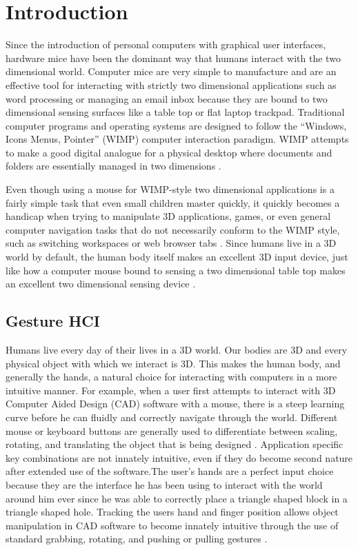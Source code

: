 \chapter{Introduction}

Since the introduction of personal computers with graphical user interfaces, hardware mice have been the dominant way that humans interact with the two dimensional world. Computer mice are very simple to manufacture and are an effective tool for interacting with strictly two dimensional applications such as word processing or managing an email inbox because they are bound to two dimensional sensing surfaces like a table top or flat laptop trackpad. Traditional computer programs and operating systems are designed to follow the “Windows, Icons Menus, Pointer” (WIMP) computer interaction paradigm. WIMP attempts to make a good digital analogue for a physical desktop where documents and folders are essentially managed in two dimensions \cite{hinckley2002input}.

Even though using a mouse for WIMP-style two dimensional applications is a fairly simple task that even small children master quickly, it quickly becomes a handicap when trying to manipulate 3D applications, games, or even general computer navigation tasks that do not necessarily conform to the WIMP style, such as switching workspaces or web browser tabs \cite{krueger1991artificial}. Since humans live in a 3D world by default, the human body itself makes an excellent 3D input device, just like how a computer mouse bound to sensing a two dimensional table top makes an excellent two dimensional sensing device \cite{wren1996pfinder}.

\section{Gesture HCI}

Humans live every day of their lives in a 3D world. Our bodies are 3D and every physical object with which we interact is 3D. This makes the human body, and generally the hands, a natural choice for interacting with computers in a more intuitive manner. For example, when a user first attempts to interact with 3D Computer Aided Design (CAD) software with a mouse, there is a steep learning curve before he can fluidly and correctly navigate through the world. Different mouse or keyboard buttons are generally used to differentiate between scaling, rotating, and translating the object that is being designed \cite{hamade2007evaluating}. Application specific key combinations are not innately intuitive, even if they do become second nature after extended use of the software.The user’s hands are a perfect input choice because they are the interface he has been using to interact with the world around him ever since he was able to correctly place a triangle shaped block in a triangle shaped hole. Tracking the users hand and finger position allows object manipulation in CAD software to become innately intuitive through the use of standard grabbing, rotating, and pushing or pulling gestures \cite{nam1996recognition}.

